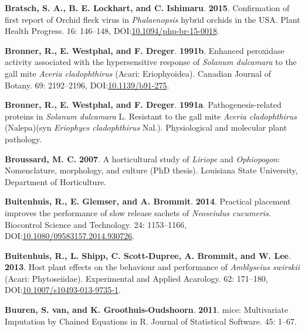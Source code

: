 \documentclass[12pt,final,CPage]{ufthesis}
\newlength{\cslhangindent}
\newenvironment{CSLReferences}[2] %
{%
	\setlength{\parindent}{0pt}
	\ifodd #1 \everypar{\setlength{\hangindent}{\cslhangindent}}\ignorespaces\fi
	\ifnum #2 > 0
	\setlength{\parskip}{#2\baselineskip}
	\fi
}%
{}
\begin{document}
{\begin{CSLReferences}{1}{0}
  \leavevmode{}%
  \textbf{Bratsch, S. A., B. E. Lockhart, and C. Ishimaru}. \textbf{2015}. Confirmation of first report of {Orchid fleck virus} in {\emph{Phalaenopsis}} hybrid orchids in the {USA}. Plant Health Progress. 16: 146--148, DOI:\href{https://doi.org/10.1094/php-br-15-0018}{10.1094/php-br-15-0018}.

  \leavevmode{}%
  \textbf{Bronner, R., E. Westphal, and F. Dreger}. \textbf{1991b}. Enhanced peroxidase activity associated with the hypersensitive response of {\emph{Solanum dulcamara}} to the gall mite {\emph{Aceria cladophthirus}} ({Acari}: {Eriophyoidea}). Canadian Journal of Botany. 69: 2192--2196, DOI:\href{https://doi.org/10.1139/b91-275}{10.1139/b91-275}.

  \leavevmode{}%
  \textbf{Bronner, R., E. Westphal, and F. Dreger}. \textbf{1991a}. Pathogenesis-related proteins in {\emph{Solanum dulcamara}} {L.} Resistant to the gall mite {\emph{Aceria cladophthirus}} ({Nalepa})(syn {\emph{Eriophyes cladophthirus}} {Nal.}). Physiological and molecular plant pathology.

  \leavevmode{}%
  \textbf{Broussard, M. C.} \textbf{2007}. A horticultural study of {\emph{Liriope}} and {\emph{Ophiopogon}}: Nomenclature, morphology, and culture (PhD thesis). Louisiana State University, Department of Horticulture.

  \leavevmode{}%
  \textbf{Buitenhuis, R., E. Glemser, and A. Brommit}. \textbf{2014}. Practical placement improves the performance of slow release sachets of {\emph{Neoseiulus cucumeris}}. Biocontrol Science and Technology. 24: 1153--1166, DOI:\href{https://doi.org/10.1080/09583157.2014.930726}{10.1080/09583157.2014.930726}.

  \leavevmode{}%
  \textbf{Buitenhuis, R., L. Shipp, C. Scott-Dupree, A. Brommit, and W. Lee}. \textbf{2013}. Host plant effects on the behaviour and performance of {\emph{Amblyseius swirskii}} ({Acari}: {Phytoseiidae}). Experimental and Applied Acarology. 62: 171--180, DOI:\href{https://doi.org/10.1007/s10493-013-9735-1}{10.1007/s10493-013-9735-1}.

  \leavevmode{}%
  \textbf{Buuren, S. van, and K. Groothuis-Oudshoorn}. \textbf{2011}. {mice}: {Multivariate} {Imputation} by {Chained} {Equations} in {R}. Journal of Statistical Software. 45: 1--67.


\end{CSLReferences}}
\end{document}
